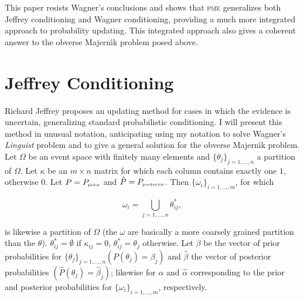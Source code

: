 
This paper resists Wagner's conclusions and shows that \textsc{pme}
generalizes both Jeffrey conditioning and Wagner conditioning,
providing a much more integrated approach to probability updating.
This integrated approach also gives a coherent answer to the obverse
Majern{\'\i}k problem posed above.

\section{Jeffrey Conditioning}
\label{jc}

Richard Jeffrey proposes an updating method for cases in which the
evidence is uncertain, generalizing standard probabilistic
conditioning. I will present this method in unusual notation,
anticipating using my notation to solve Wagner's \emph{Linguist}
problem and to give a general solution for the obverse Majern{\'\i}k
problem. Let $\Omega$ be an event space with finitely many elements
and $\{\theta_{j}\}_{j=1,\ldots,n}$ a partition of $\Omega$. Let
$\kappa$ be an $m\times{}n$ matrix for which each column contains
exactly one $1$, otherwise $0$. Let $P=P_{\mbox{\tiny{prior}}}$ and
$\hat{P}=P_{\mbox{\tiny{posterior}}}$. Then
$\{\omega_{i}\}_{i=1,\ldots,m}$, for which

\begin{equation}
  \label{eq:m1}
  \omega_{i}=\bigcup_{j=1,\dots,n}\theta^{*}_{ij},
\end{equation}

{\noindent}is likewise a partition of $\Omega$ (the $\omega$ are
basically a more coarsely grained partition than the $\theta$).
$\theta^{*}_{ij}=\emptyset$ if $\kappa_{ij}=0$,
$\theta^{*}_{ij}=\theta_{j}$ otherwise. Let $\beta$ be the vector of
prior probabilities for $\{\theta_{j}\}_{j=1,\ldots,n}
(P(\theta_{j})=\beta_{j})$ and $\hat{\beta}$ the vector of posterior
probabilities $(\hat{P}(\theta_{j})=\hat{\beta}_{j})$; likewise for
$\alpha$ and $\hat{\alpha}$ corresponding to the prior and posterior
probabilities for $\{\omega_{i}\}_{i=1,\ldots,m}$, respectively.

